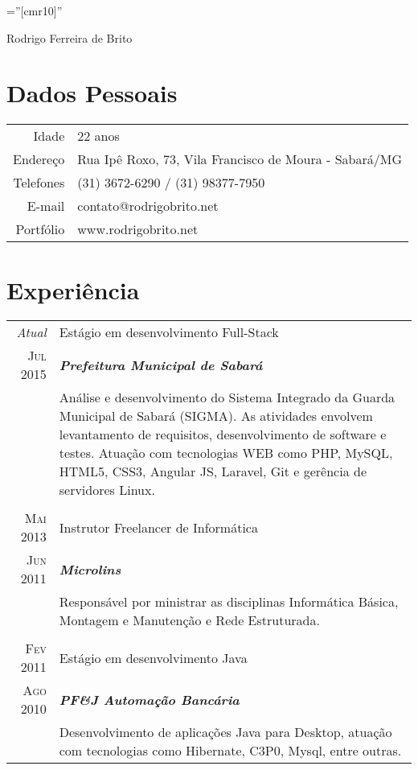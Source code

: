 \documentclass[a4paper,10pt]{article}
\begin{document}
\pagestyle{empty} %

\font\fb=''[cmr10]'' %

\vspace*{-1cm}
\par{\centering
	{\Huge Rodrigo Ferreira de Brito
}\bigskip\par}

\section{Dados Pessoais}

\begin{tabular}{rl}
Idade & 22 anos\\
Endereço & Rua Ipê Roxo, 73, Vila Francisco de Moura - Sabará/MG\\    
Telefones & (31) 3672-6290 / (31) 98377-7950\\
E-mail & contato@rodrigobrito.net\\
Portfólio & www.rodrigobrito.net\\
\end{tabular}

\section{Experiência}
\begin{tabular}{r|p{13.1cm}}
	\emph{Atual} & Estágio em desenvolvimento Full-Stack \\
	\textsc{Jul 2015}&\emph{\textbf{Prefeitura Municipal de Sabará}}\\
		 &\footnotesize{Análise e desenvolvimento do Sistema Integrado da Guarda Municipal de Sabará (SIGMA). As atividades envolvem levantamento de requisitos, desenvolvimento de software e testes. Atuação com tecnologias WEB como PHP, MySQL, HTML5, CSS3, Angular JS, Laravel, Git e gerência de servidores Linux.}\\
	\multicolumn{2}{c}{} \\
	\textsc{Mai 2013} & Instrutor Freelancer de Informática \\
		 \textsc{Jun 2011}&\emph{\textbf{Microlins}}\\
		 &\footnotesize{Responsável por ministrar as disciplinas Informática Básica, Montagem e Manutenção e Rede Estruturada.}\\
	\multicolumn{2}{c}{} \\
	\textsc{Fev 2011} & Estágio em desenvolvimento Java\\
		\textsc{Ago 2010}&\emph{\textbf{PF\&J Automação Bancária}}\\
		& \footnotesize{Desenvolvimento de aplicações Java para Desktop, atuação com tecnologias como Hibernate, C3P0, Mysql, entre outras.}
\end{tabular}
\end{document}
